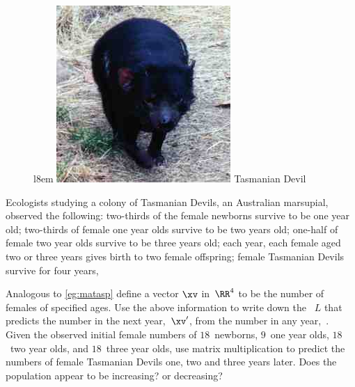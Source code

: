 \begin{figure}l{8em}
\includegraphics[width=\linewidth]{Matrices/tasmanianDevil}
Tasmanian Devil
\end{figure}
\begin{exercise}  
Ecologists studying a colony of Tasmanian Devils, an Australian marsupial, observed the following:
two-thirds of the female newborns survive to be one year old;
two-thirds of female one year olds survive to be two years old;
one-half of female two year olds survive to be three years old;
each year, each female aged two or three years gives birth to two female offspring;
female Tasmanian Devils survive for four years, 

Analogous to \cref{eg:matasp} define a vector \(\xv\) in~\(\RR^4\) to be the number of females of specified ages.
Use the above information to write down the ~\(L\) that predicts the number in the next year,~\(\xv'\), from the number in any year,~\xv.
Given the observed initial female numbers of \(18\)~newborns, \(9\)~one year olds, \(18\)~two year olds, and \(18\)~three year olds, use matrix multiplication to predict the numbers of female Tasmanian Devils one, two and three years later.
Does the population appear to be increasing? or decreasing?
\end{exercise}


